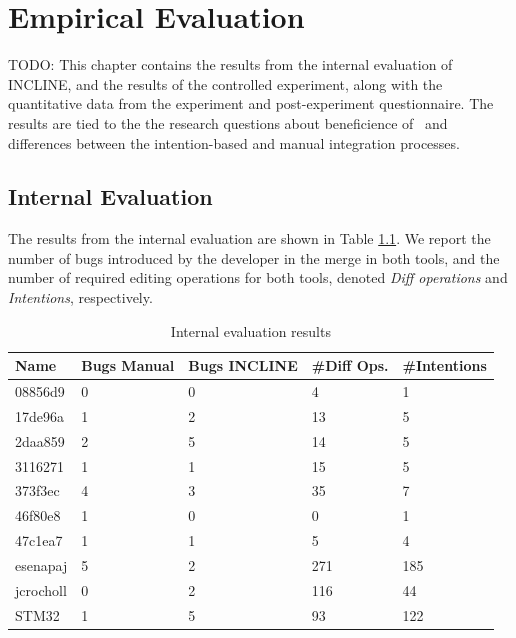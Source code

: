 \chapter{Empirical Evaluation}TODO:
This chapter contains the results from the internal evaluation of INCLINE, and the results of the controlled experiment, along with the quantitative data from the experiment and post-experiment questionnaire. The results are tied to the the research questions about beneficience of \tooln~and differences between the intention-based and manual integration processes.

\section{Internal Evaluation}
The results from the internal evaluation are shown in Table \ref{tab:internalres}. We report the number of bugs introduced by the developer in the merge in both tools, and the number of required editing operations for both tools, denoted \textit{Diff operations} and \textit{Intentions}, respectively. 

\begin{table}[h]
    \centering
    \caption{Internal evaluation results}
    \label{tab:internalres}
    \begin{tabular}{l|llll}
\hline\hline
\textbf{Name} & \textbf{Bugs Manual} & \textbf{Bugs INCLINE} & \textbf{\#Diff Ops.} & \textbf{\#Intentions}\\
\hline
08856d9      & 0     & 0     & 4     & 1     \\
17de96a      & 1     & 2     & 13    & 5     \\
2daa859      & 2     & 5     & 14    & 5     \\
3116271      & 1     & 1     & 15    & 5     \\
373f3ec      & 4     & 3     & 35    & 7     \\
46f80e8      & 1     & 0     & 0     & 1     \\
47c1ea7      & 1     & 1     & 5     & 4     \\
\hline
esenapaj     & 5     & 2     & 271   & 185   \\ %
jcrocholl    & 0     & 2     & 116   & 44    \\
STM32   & 1     & 5     & 93    & 122   \\ %
\hline\hline
    \end{tabular}
\end{table}

